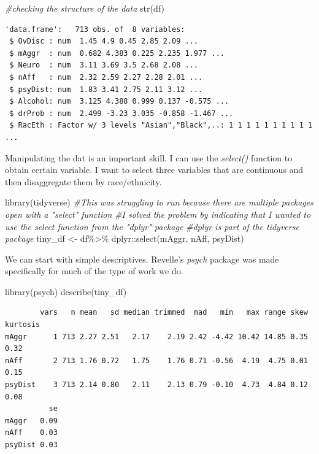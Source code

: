 \documentclass[
  english,
]{book}
\newenvironment{Shaded}{\begin{snugshade}}{\end{snugshade}}
\newcommand{\CommentTok}[1]{\textcolor[rgb]{0.56,0.35,0.01}{\textit{#1}}}
\newcommand{\FunctionTok}[1]{\textcolor[rgb]{0.00,0.00,0.00}{#1}}
\newcommand{\NormalTok}[1]{#1}
\newcommand{\OtherTok}[1]{\textcolor[rgb]{0.56,0.35,0.01}{#1}}
\newcommand{\SpecialCharTok}[1]{\textcolor[rgb]{0.00,0.00,0.00}{#1}}
\begin{document}
\begin{Shaded}
\begin{Highlighting}[]
\CommentTok{\#checking the structure of the data}
\FunctionTok{str}\NormalTok{(df)}
\end{Highlighting}
\end{Shaded}

\begin{verbatim}
'data.frame':   713 obs. of  8 variables:
 $ OvDisc : num  1.45 4.9 0.45 2.85 2.09 ...
 $ mAggr  : num  0.682 4.383 0.225 2.235 1.977 ...
 $ Neuro  : num  3.11 3.69 3.5 2.68 2.08 ...
 $ nAff   : num  2.32 2.59 2.27 2.28 2.01 ...
 $ psyDist: num  1.83 3.41 2.75 2.11 3.12 ...
 $ Alcohol: num  3.125 4.388 0.999 0.137 -0.575 ...
 $ drProb : num  2.499 -3.23 3.035 -0.858 -1.467 ...
 $ RacEth : Factor w/ 3 levels "Asian","Black",..: 1 1 1 1 1 1 1 1 1 1 ...
\end{verbatim}

Manipulating the dat is an important skill. I can use the \emph{select()} function to obtain certain variable. I want to select three variables that are continuous and then disaggregate them by race/ethnicity.

\begin{Shaded}
\begin{Highlighting}[]
\FunctionTok{library}\NormalTok{(tidyverse)}
\CommentTok{\#This was struggling to run because there are multiple packages open with a "select" function}
\CommentTok{\#I solved the problem by indicating that I wanted to use the select function from the "dplyr" package}
\CommentTok{\#dplyr is part of the tidyverse package}
\NormalTok{tiny\_df }\OtherTok{\textless{}{-}}\NormalTok{ df}\SpecialCharTok{\%\textgreater{}\%}
\NormalTok{  dplyr}\SpecialCharTok{::}\FunctionTok{select}\NormalTok{(mAggr, nAff, psyDist)}
\end{Highlighting}
\end{Shaded}

We can start with simple descriptives. Revelle's \citeyearpar{revelle_introduction_2020} \emph{psych} package was made specifically for much of the type of work we do.

\begin{Shaded}
\begin{Highlighting}[]
\FunctionTok{library}\NormalTok{(psych)}
\FunctionTok{describe}\NormalTok{(tiny\_df)}
\end{Highlighting}
\end{Shaded}

\begin{verbatim}
        vars   n mean   sd median trimmed  mad   min   max range skew kurtosis
mAggr      1 713 2.27 2.51   2.17    2.19 2.42 -4.42 10.42 14.85 0.35     0.32
nAff       2 713 1.76 0.72   1.75    1.76 0.71 -0.56  4.19  4.75 0.01     0.15
psyDist    3 713 2.14 0.80   2.11    2.13 0.79 -0.10  4.73  4.84 0.12     0.08
          se
mAggr   0.09
nAff    0.03
psyDist 0.03
\end{verbatim}
\end{document}
